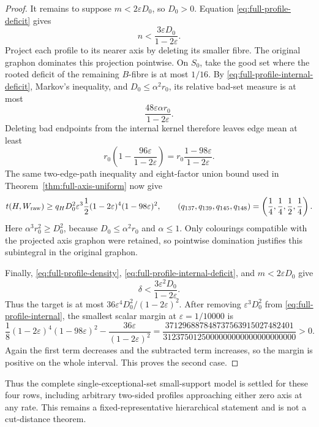 \documentclass[11pt]{article}
\begin{document}
\begin{proof}
It remains to suppose $m<2\varepsilon D_0$, so $D_0>0$.  Equation
\eqref{eq:full-profile-deficit} gives
\begin{equation}
 n<\frac{3\varepsilon D_0}{1-2\varepsilon}.
 \label{eq:full-profile-internal-deficit}
\end{equation}
Project each profile to its nearer axis by deleting its smaller fibre.  The
original graphon dominates this projection pointwise.  On $S_0$, take the
good set where the rooted deficit of the remaining $B$-fibre is at most
$1/16$.  By \eqref{eq:full-profile-internal-deficit}, Markov's inequality,
and $D_0\leq\alpha^2r_0$, its relative bad-set measure is at most
\[
 \frac{48\varepsilon\alpha r_0}{1-2\varepsilon}.
\]
Deleting bad endpoints from the internal kernel therefore leaves edge mean
at least
\[
 r_0\left(1-\frac{96\varepsilon}{1-2\varepsilon}\right)
 =r_0\frac{1-98\varepsilon}{1-2\varepsilon}.
\]
The same two-edge-path inequality and eight-factor union bound used in
Theorem~\ref{thm:full-axis-uniform} now give
\begin{equation}
 t(H,W_{\rm raw})\geq
 q_HD_0^2\varepsilon^3
 \frac12(1-2\varepsilon)^4(1-98\varepsilon)^2,
 \qquad
 (q_{137},q_{139},q_{145},q_{148})
 =\left(\frac14,\frac14,\frac12,\frac14\right).
 \label{eq:full-profile-internal}
\end{equation}
Here $\alpha^3r_0^2\geq D_0^2$, because
$D_0\leq\alpha^2r_0$ and $\alpha\leq1$.
Only colourings compatible with the projected axis graphon were retained,
so pointwise domination justifies this subintegral in the original graphon.

Finally, \eqref{eq:full-profile-density},
\eqref{eq:full-profile-internal-deficit}, and
$m<2\varepsilon D_0$ give
\[
 \delta<\frac{3\varepsilon^2D_0}{1-2\varepsilon}.
\]
Thus the target is at most
$36\varepsilon^4D_0^2/(1-2\varepsilon)^2$.  After removing
$\varepsilon^3D_0^2$ from \eqref{eq:full-profile-internal}, the smallest
scalar margin at $\varepsilon=1/10000$ is
\begin{equation}
 \frac18(1-2\varepsilon)^4(1-98\varepsilon)^2
 -\frac{36\varepsilon}{(1-2\varepsilon)^2}
 =\frac{371296887848737563915027482401}
        {3123750125000000000000000000000}>0.
 \label{eq:full-profile-internal-slack}
\end{equation}
Again the first term decreases and the subtracted term increases, so the
margin is positive on the whole interval.  This proves the second case.
\end{proof}

Thus the complete single-exceptional-set small-support model is settled for
these four rows, including arbitrary two-sided profiles approaching either
zero axis at any rate.  This remains a fixed-representative hierarchical
statement and is not a cut-distance theorem.
\end{document}
